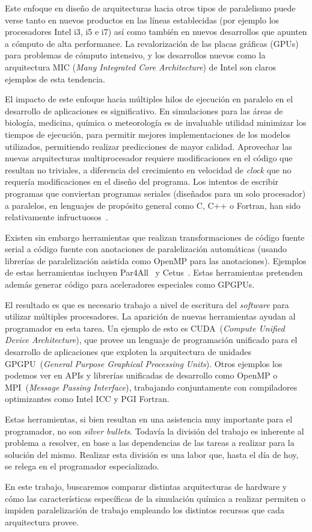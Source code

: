 Este enfoque en dise\~no de arquitecturas hacia otros tipos de paralelismo puede verse tanto en nuevos productos en las l\'ineas establecidas (por ejemplo los procesadores Intel i3, i5 e i7) as\'i como tambi\'en en nuevos desarrollos que apunten a c\'omputo de alta performance.
La revalorizaci\'on de las placas gr\'aficas (GPUs) para problemas de c\'omputo intensivo, y los desarrollos nuevos como la arquitectura MIC (\textit{Many Integrated Core Architecture}) de Intel son claros ejemplos de esta tendencia.

El impacto de este enfoque hacia m\'ultiples hilos de ejecuci\'on en paralelo en el desarrollo de aplicaciones es significativo.
En simulaciones para las \'areas de biolog\'ia, medicina, qu\'imica o meteorolog\'ia es de invaluable utilidad minimizar los tiempos de ejecuci\'on, para permitir mejores implementaciones de los modelos utilizados, permitiendo realizar predicciones de mayor calidad.
Aprovechar las nuevas arquitecturas multiprocesador requiere modificaciones en el c\'odigo que resultan no triviales, a diferencia del crecimiento en velocidad de \textit{clock} que no requer\'ia modificaciones en el dise\~no del programa.
Los intentos de escribir programas que conviertan programas seriales (dise\~nados para un solo procesador) a paralelos, en lenguajes de prop\'osito general como C, C++ o Fortran, han sido relativamente infructuosos~\cite{Pacheco}.

Existen sin embargo herramientas que realizan transformaciones de c\'odigo fuente serial a c\'odigo fuente con anotaciones de paralelizaci\'on autom\'aticas (usando librer\'ias de paralelizaci\'on asistida como OpenMP para las anotaciones).
Ejemplos de estas herramientas incluyen Par4All~\cite{Par4AllThesis} y Cetus~\cite{CetusPaper}. Estas herramientas pretenden adem\'as generar c\'odigo para aceleradores especiales como GPGPUs.

El resultado es que es necesario trabajo a nivel de escritura del \textit{software} para utilizar m\'ultiples procesadores.
La aparici\'on de nuevas herramientas ayudan al programador en esta tarea.
Un ejemplo de esto es \nvidia CUDA~(\textit{Compute Unified Device Architecture}), que provee un lenguaje de programaci\'on unificado para el desarrollo de aplicaciones que exploten la arquitectura de unidades GPGPU~(\textit{General Purpose Graphical Processing Units}).
Otros ejemplos los podemos ver en APIs y librer\'ias unificadas de desarrollo como OpenMP o MPI~(\textit{Message Passing Interface}), trabajando conjuntamente con compiladores
optimizantes como Intel ICC y PGI Fortran.

Estas herramientas, si bien resultan en una asistencia muy importante para el programador, no son \textit{silver bullets}.
Todav\'ia la divisi\'on del trabajo es inherente al problema a resolver, en base a las dependencias de las tareas a realizar para la soluci\'on del mismo.
Realizar esta divisi\'on es una labor que, hasta el d\'ia de hoy, se relega en el programador especializado.

En este trabajo, buscaremos comparar distintas arquitecturas de hardware y c\'omo las caracter\'isticas espec\'ificas de la simulaci\'on qu\'imica a realizar permiten o impiden paralelizaci\'on de trabajo empleando los distintos recursos que cada arquitectura provee.
